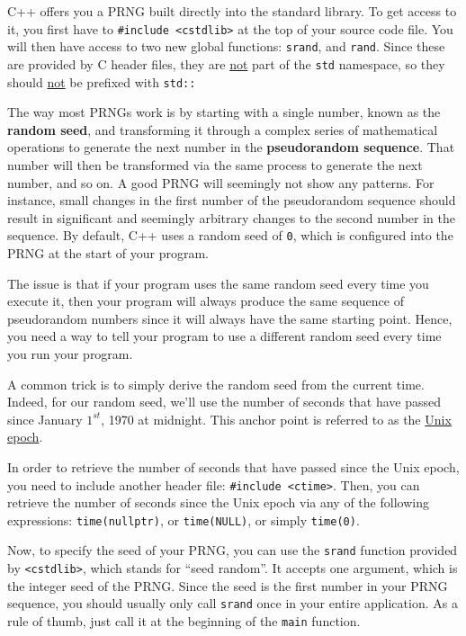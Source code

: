 \documentclass{article}
\begin{document}
C++ offers you a PRNG built directly into the standard library. To get access to it, you first have to \texttt{\#include <cstdlib>} at the top of your source code file. You will then have access to two new global functions: \texttt{srand}, and \texttt{rand}. Since these are provided by C header files, they are \ul{not} part of the \texttt{std} namespace, so they should \ul{not} be prefixed with \texttt{std::}

The way most PRNGs work is by starting with a single number, known as the \textbf{random seed}, and transforming it through a complex series of mathematical operations to generate the next number in the \textbf{pseudorandom sequence}. That number will then be transformed via the same process to generate the next number, and so on. A good PRNG will seemingly not show any patterns. For instance, small changes in the first number of the pseudorandom sequence should result in significant and seemingly arbitrary changes to the second number in the sequence. By default, C++ uses a random seed of \texttt{0}, which is configured into the PRNG at the start of your program.

The issue is that if your program uses the same random seed every time you execute it, then your program will always produce the same sequence of pseudorandom numbers since it will always have the same starting point. Hence, you need a way to tell your program to use a different random seed every time you run your program.

A common trick is to simply derive the random seed from the current time. Indeed, for our random seed, we'll use the number of seconds that have passed since January $1^{st}$, 1970 at midnight. This anchor point is referred to as the \href{https://en.wikipedia.org/wiki/Unix_time}{Unix epoch}.

In order to retrieve the number of seconds that have passed since the Unix epoch, you need to include another header file: \texttt{\#include <ctime>}. Then, you can retrieve the number of seconds since the Unix epoch via any of the following expressions: \texttt{time(nullptr)}, or \texttt{time(NULL)}, or simply \texttt{time(0)}.

Now, to specify the seed of your PRNG, you can use the \texttt{srand} function provided by \texttt{<cstdlib>}, which stands for ``seed random''. It accepts one argument, which is the integer seed of the PRNG. Since the seed is the first number in your PRNG sequence, you should usually only call \texttt{srand} once in your entire application. As a rule of thumb, just call it at the beginning of the \texttt{main} function.
\end{document}

